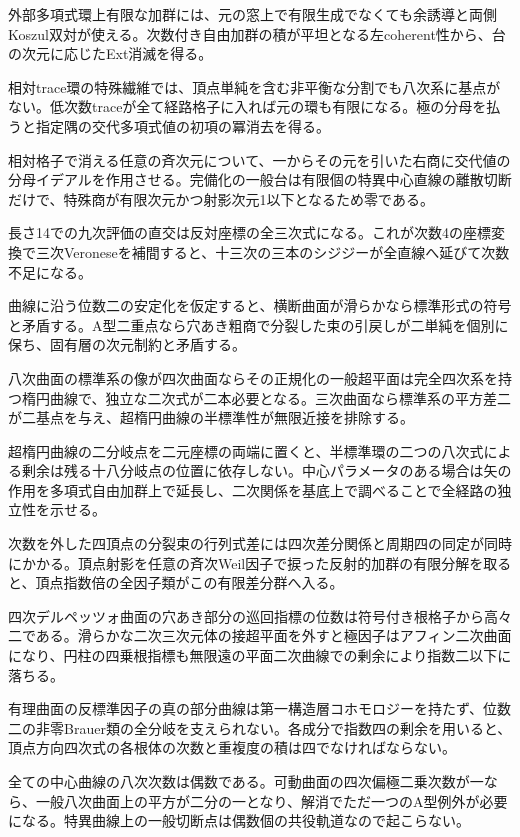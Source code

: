 \documentclass[11pt,a4paper]{ltjsarticle}
\begin{document}
外部多項式環上有限な加群には、元の窓上で有限生成でなくても余誘導と両側Koszul双対が使える。次数付き自由加群の積が平坦となる左coherent性から、台の次元に応じたExt消滅を得る。

相対trace環の特殊繊維では、頂点単純を含む非平衡な分割でも八次系に基点がない。低次数traceが全て経路格子に入れば元の環も有限になる。極の分母を払うと指定隅の交代多項式値の初項の冪消去を得る。

相対格子で消える任意の斉次元について、一からその元を引いた右商に交代値の分母イデアルを作用させる。完備化の一般台は有限個の特異中心直線の離散切断だけで、特殊商が有限次元かつ射影次元1以下となるため零である。

長さ14での九次評価の直交は反対座標の全三次式になる。これが次数4の座標変換で三次Veroneseを補間すると、十三次の三本のシジジーが全直線へ延びて次数不足になる。

曲線に沿う位数二の安定化を仮定すると、横断曲面が滑らかなら標準形式の符号と矛盾する。A型二重点なら穴あき粗商で分裂した束の引戻しが二単純を個別に保ち、固有層の次元制約と矛盾する。

八次曲面の標準系の像が四次曲面ならその正規化の一般超平面は完全四次系を持つ楕円曲線で、独立な二次式が二本必要となる。三次曲面なら標準系の平方差二が二基点を与え、超楕円曲線の半標準性が無限近接を排除する。

超楕円曲線の二分岐点を二元座標の両端に置くと、半標準環の二つの八次式による剰余は残る十八分岐点の位置に依存しない。中心パラメータのある場合は矢の作用を多項式自由加群上で延長し、二次関係を基底上で調べることで全経路の独立性を示せる。

次数を外した四頂点の分裂束の行列式差には四次差分関係と周期四の同定が同時にかかる。頂点射影を任意の斉次Weil因子で捩った反射的加群の有限分解を取ると、頂点指数倍の全因子類がこの有限差分群へ入る。

四次デルペッツォ曲面の穴あき部分の巡回指標の位数は符号付き根格子から高々二である。滑らかな二次三次元体の接超平面を外すと極因子はアフィン二次曲面になり、円柱の四乗根指標も無限遠の平面二次曲線での剰余により指数二以下に落ちる。

有理曲面の反標準因子の真の部分曲線は第一構造層コホモロジーを持たず、位数二の非零Brauer類の全分岐を支えられない。各成分で指数四の剰余を用いると、頂点方向四次式の各根体の次数と重複度の積は四でなければならない。

全ての中心曲線の八次次数は偶数である。可動曲面の四次偏極二乗次数が一なら、一般八次曲面上の平方が二分の一となり、解消でただ一つのA型例外が必要になる。特異曲線上の一般切断点は偶数個の共役軌道なので起こらない。
\end{document}
